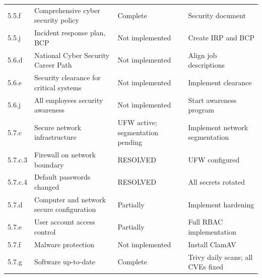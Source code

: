 \begin{center}
\begin{longtable}{|p{}|p{}|p{}|p{}|}
5.5.f & Comprehensive cyber security policy & Complete & Security document \\
5.5.j & Incident response plan, BCP & Not implemented & Create IRP and BCP \\
5.6.d & National Cyber Security Career Path & Not implemented & Align job descriptions \\
5.6.e & Security clearance for critical systems & Not implemented & Implement clearance \\
5.6.j & All employees security awareness & Not implemented & Start awareness program \\
5.7.c & Secure network infrastructure & UFW active; segmentation pending & Implement network segmentation \\
5.7.c.3 & Firewall on network boundary & RESOLVED & UFW configured \\
5.7.c.4 & Default passwords changed & RESOLVED & All secrets rotated \\
5.7.d & Computer and network secure configuration & Partially & Implement hardening \\
5.7.e & User account access control & Partially & Full RBAC implementation \\
5.7.f & Malware protection & Not implemented & Install ClamAV \\
5.7.g & Software up-to-date & Complete & Trivy daily scans; all CVEs fixed \\
\hline
\end{longtable}
\end{center}

